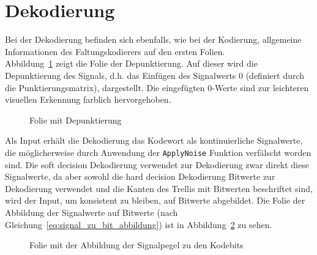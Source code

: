 \section{Dekodierung}
\label{kapitel:visualisierung_dekodierung}
Bei der Dekodierung befinden sich ebenfalls, wie bei der Kodierung, allgemeine Informationen des Faltungskodierers auf den ersten Folien.
\\
Abbildung~\ref{abb:folie_depunktierung} zeigt die Folie der Depunktierung. Auf dieser wird die Depunktierung des Signals, d.h. das Einfügen des Signalwerts 0 (definiert durch die Punktierungsmatrix), dargestellt. Die eingefügten 0-Werte sind zur leichteren visuellen Erkennung farblich hervorgehoben.
\begin{figure}[th]
	\centering
	\caption{Folie mit Depunktierung}
	\label{abb:folie_depunktierung}
\end{figure}
Als Input erhält die Dekodierung das Kodewort als kontinuierliche Signalwerte, die möglicherweise durch Anwendung der \texttt{ApplyNoise} Funktion verfälscht worden sind. Die soft decision Dekodierung verwendet zur Dekodierung zwar direkt diese Signalwerte, da aber sowohl die hard decision Dekodierung Bitwerte zur Dekodierung verwendet und die Kanten des Trellis mit Bitwerten beschriftet sind, wird der Input, um konsistent zu bleiben, auf Bitwerte abgebildet. Die Folie der Abbildung der Signalwerte auf Bitwerte (nach Gleichung~\ref{eq:signal_zu_bit_abbildung}) ist in Abbildung~\ref{abb:folie_signal_zu_bit_abbildung} zu sehen.
\begin{figure}[th]
	\centering
	\caption{Folie mit der Abbildung der Signalpegel zu den Kodebits}
	\label{abb:folie_signal_zu_bit_abbildung}
\end{figure}
